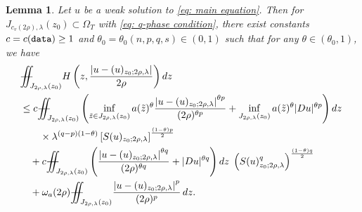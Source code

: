 \documentclass[11pt,oneside, english,reqno,twoside a4paper]{amsart}
\newtheorem{lemma}{Lemma}[section]
\theoremstyle{definition}
\numberwithin{theorem}{section}
\numberwithin{equation}{section}
\newcommand{\iintss}{{\int\hspace{-0.28cm}\int}}
\newcommand{ \miints }{{\iintss\hspace{-0.56cm} -\hspace{-0.15cm}-}}
\newcommand{\miint}[1]{{\miints_{\hspace{-0.13cm}#1}}}
\begin{document}
\begin{lemma}\label{Lem : lemma 3.11}
    Let $u$ be a weak solution to \eqref{eq: main equation}. Then for $J_{c_v(2 \rho),\lambda}\left(z_0\right) \subset \Omega_T$ with \eqref{eq: q-phase condition}, there exist constants $c=c(\textnormal{\texttt{data}}) \geq 1$ and $\theta_0=\theta_0(n, p, q, s) \in(0,1)$ such that for any $\theta \in\left(\theta_0, 1\right)$, we have
    $$
    \begin{aligned}
    &\miint{J_{2 \rho,\lambda}\left(z_0\right)} H\left(z,\frac{\left|u-(u)_{z_0 ; 2 \rho,\lambda}\right|}{2 \rho}\right) dz \\
    &\leq c \miint{J_{2 \rho,\lambda}\left(z_0\right)}\left(\inf_{\tilde{z} \in J_{2\rho, \lambda}(z_0)}a(\tilde{z})^{\theta}\frac{\left|u-(u)_{z_0 ; 2 \rho,\lambda}\right|^{\theta p}}{(2 \rho)^{\theta p}}+\inf_{J_{2\rho, \lambda}(z_0)}a(\tilde{z})^{\theta}|D u|^{\theta p}\right) dz\;\\
    &\qquad \times \lambda^{(q-p)(1-\theta)}\left[S(u)_{z_0 ; 2 \rho,\lambda}\right]^{\frac{(1-\theta) p}{2}} \\
    &\quad +c \miint{J_{2 \rho,\lambda}\left(z_0\right)}\left( \frac{\left|u-(u)_{z_0 ; 2 \rho,\lambda}\right|^{\theta q}}{(2 \rho)^{\theta q}}+|D u|^{\theta q}\right) dz \;\left(S(u)^q_{z_0 ; 2 \rho,\lambda}\right)^{\frac{(1-\theta) q}{2}}\\
    &\quad + \omega_a(2\rho)\miint{J_{2\rho, \lambda}(z_0)}\frac{\left|u-(u)_{z_0 ; 2 \rho,\lambda}\right|^p}{(2 \rho)^p}\,dz.
    \end{aligned}
    $$
\end{lemma}
\end{document}
